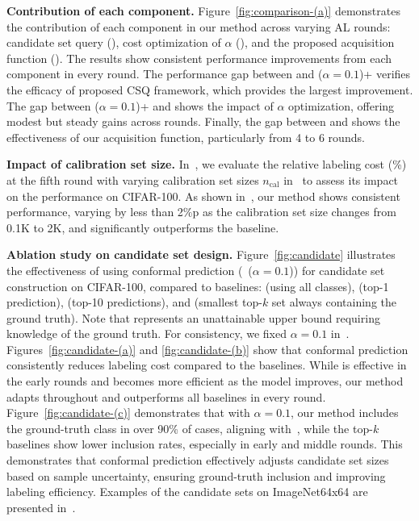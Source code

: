 \noindent\textbf{Contribution of each component.}
Figure~\ref{fig:comparison-(a)} demonstrates the contribution of each component in our method across varying AL rounds: candidate set query (), cost optimization of $\alpha$ (), and the proposed acquisition function ().
The results show consistent performance improvements from each component in every round.
The performance gap between  and ($\alpha=0.1$)+ verifies the efficacy of proposed CSQ framework, which provides the largest improvement.
The gap between ($\alpha=0.1$)+ and  shows the impact of $\alpha$ optimization, offering modest but steady gains across rounds.
Finally, the gap between  and  shows the effectiveness of our acquisition function, particularly from 4 to 6 rounds.

\noindent\textbf{Impact of calibration set size.}
In~, we evaluate the relative labeling cost (\%) at the fifth round with varying calibration set sizes $n_\text{cal}$ in~ to assess its impact on the performance on CIFAR-100.
As shown in~, our method shows consistent performance, varying by less than 2\%p as the calibration set size changes from 0.1K to 2K, and significantly outperforms the baseline.

\noindent\textbf{Ablation study on candidate set design.}
Figure~\ref{fig:candidate} illustrates the effectiveness of using conformal prediction (~($\alpha=0.1$)) for candidate set construction on CIFAR-100, compared to baselines:  (using all classes),  (top-1 prediction),  (top-10 predictions), and  (smallest top-$k$ set always containing the ground truth).
Note that  represents an unattainable upper bound requiring knowledge of the ground truth.
For consistency, we fixed $\alpha=0.1$ in~.
Figures~\ref{fig:candidate-(a)} and \ref{fig:candidate-(b)} show that conformal prediction consistently reduces labeling cost compared to the baselines.
While  is effective in the early rounds and  becomes more efficient as the model improves, our method adapts throughout and outperforms all baselines in every round.
Figure~\ref{fig:candidate-(c)} demonstrates that with $\alpha=0.1$, our method includes the ground-truth class in over 90\% of cases, aligning with~, while the top-$k$ baselines show lower inclusion rates, especially in early and middle rounds.
This demonstrates that conformal prediction effectively adjusts candidate set sizes based on sample uncertainty, ensuring ground-truth inclusion and improving labeling efficiency.
Examples of the candidate sets on ImageNet64x64 are presented in~.


